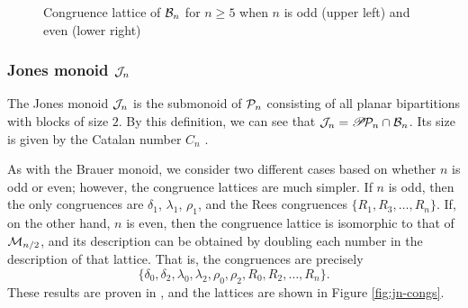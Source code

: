 \begin{figure}[p]
  \caption[Congruence lattice of $\Brau_n$]{Congruence lattice of $\Brau_n$ for $n \geq 5$ when
    $n$ is odd (upper left) and even (lower right)}
  \label{fig:bn-congs}
\end{figure}

\subsubsection{Jones monoid $\mathcal{J}_n$}

The Jones monoid $\mathcal{J}_n$ is the submonoid of $\mathcal{P}_n$ consisting of all planar
bipartitions with blocks of size $2$.  By this definition, we can see that
$\mathcal{J}_n = \mathscr{P}\!\mathcal{P}_n \cap \mathcal{B}_n$.  Its size is given by the Catalan number $C_n$
.

As with the Brauer monoid, we consider two different cases based on whether $n$
is odd or even; however, the congruence lattices are much simpler.  If $n$ is
odd, then the only congruences are $\delta_1$, $\lambda_1$, $\rho_1$, and the
Rees congruences $\{R_1, R_3, \ldots, R_n\}$.  If, on the other hand, $n$ is even,
then the congruence lattice is isomorphic to that of $\mathcal{M}_{n/2}$, and its
description can be obtained by doubling each number in the description of that
lattice.  That is, the congruences are precisely
$$\{\delta_0, \delta_2, \lambda_0, \lambda_2, \rho_0, \rho_2, R_0, R_2, \ldots,
R_n\}.$$
These results are proven in \cite[\S9]{ourpaper}, and the lattices are shown in
Figure \ref{fig:jn-congs}.

